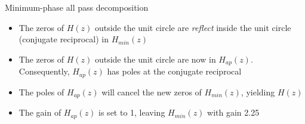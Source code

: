 \documentclass[10pt]{beamer}
\begin{document}
\begin{frame}{Minimum-phase all pass decomposition}

\hspace*{-0.85cm}\resizebox{0.95\paperwidth}{!}{}
\begin{itemize}
	\item The zeros of $H(z)$ outside the unit circle are \textit{reflect} inside the unit circle (conjugate reciprocal) in $H_{min}(z)$
	\item The zeros of $H(z)$ outside the unit circle are now in $H_{ap}(z)$. Consequently, $H_{ap}(z)$ has poles at the conjugate reciprocal
	\item The poles of $H_{ap}(z)$ will cancel the new zeros of $H_{min}(z)$, yielding $H(z)$
	\item The gain of $H_{ap}(z)$ is set to 1, leaving $H_{min}(z)$ with gain 2.25
\end{itemize}
\end{frame}
\end{document}
